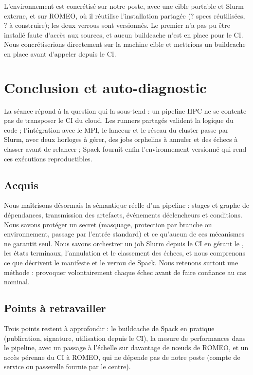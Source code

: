 \documentclass[11pt,a4paper]{article}
\newcommand{\spackreuse}{?}
\newcommand{\spackbuild}{?}
\begin{document}
{{{{{{{L'environnement est concrétisé sur notre poste, avec une cible portable et Slurm externe, et sur
ROMEO, où il réutilise l'installation partagée\ifromeo{} (\spackreuse{} specs réutilisées,
\spackbuild{} à construire)\fi ; les deux verrous sont versionnés. Le premier n'a pas pu être
installé faute d'accès aux sources, et aucun buildcache n'est en place pour le CI. Nous
concrétiserions directement sur la machine cible et mettrions un buildcache en place avant
d'appeler  depuis le CI.

\section{Conclusion et auto-diagnostic}

La séance répond à la question qui la sous-tend : un pipeline HPC ne se contente pas de
transposer le CI du cloud. Les runners partagés valident la logique du code ; l'intégration avec
le MPI, le lanceur et le réseau du cluster passe par Slurm, avec deux horloges à gérer, des jobs
orphelins à annuler et des échecs à classer avant de relancer ; Spack fournit enfin
l'environnement versionné qui rend ces exécutions reproductibles.

\subsection{Acquis}

Nous maîtrisons désormais la sémantique réelle d'un pipeline : stages et graphe de dépendances,
transmission des artefacts, événements déclencheurs et conditions. Nous savons protéger un secret
(masquage, protection par branche ou environnement, passage par l'entrée standard) et ce
qu'aucun de ces mécanismes ne garantit seul. Nous savons orchestrer un job Slurm depuis le CI en
gérant le , les états terminaux, l'annulation et le classement des échecs, et nous
comprenons ce que décrivent le manifeste et le verrou de Spack. Nous retenons surtout une méthode :
provoquer volontairement chaque échec avant de faire confiance au cas nominal.

\subsection{Points à retravailler}

Trois points restent à approfondir : le buildcache de Spack en pratique (publication,
signature, utilisation depuis le CI), la mesure de performances dans le pipeline, avec un
passage à l'échelle sur davantage de nœuds de ROMEO, et un accès pérenne du CI à ROMEO,
qui ne dépende pas de notre poste (compte de service ou passerelle fournie par le centre).

}}}}}}}
\end{document}
